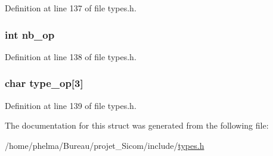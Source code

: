 Definition at line 137 of file types.\-h.

\hypertarget{struct__dic___a88a29c0db6a919d126d1c94d573dd711}{
\subsubsection[{nb\-\_\-op}]{\setlength{\rightskip}{0pt plus 5cm}int nb\-\_\-op}}\label{struct__dic___a88a29c0db6a919d126d1c94d573dd711}


Definition at line 138 of file types.\-h.

\hypertarget{struct__dic___ae12e6412760866fc84c44da4df21f495}{
\subsubsection[{type\-\_\-op}]{\setlength{\rightskip}{0pt plus 5cm}char type\-\_\-op\mbox{[}3\mbox{]}}}\label{struct__dic___ae12e6412760866fc84c44da4df21f495}


Definition at line 139 of file types.\-h.



The documentation for this struct was generated from the following file\-:\begin{DoxyCompactItemize}
\item 
/home/phelma/\-Bureau/projet\-\_\-\-Sicom/include/\hyperlink{types_8h}{types.\-h}\end{DoxyCompactItemize}
